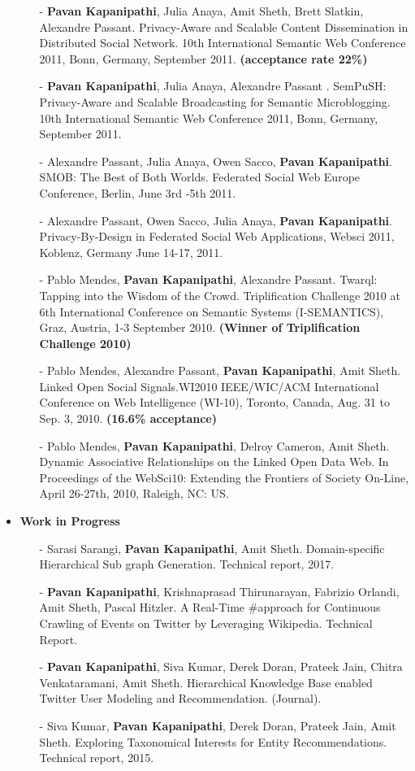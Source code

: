 \documentclass[letterpaper,9pt]{article}
\begin{document}
\begin{itemize}
\begin{itemize}
\item[-] \textbf{Pavan Kapanipathi}, Julia Anaya, Amit Sheth, Brett Slatkin, Alexandre Passant. Privacy-Aware and Scalable Content Dissemination in Distributed Social Network. 10th International Semantic Web Conference 2011, Bonn, Germany,  September 2011. \textbf{(acceptance rate 22\%)}
\item[-] \textbf{Pavan Kapanipathi}, Julia Anaya, Alexandre Passant . SemPuSH: Privacy-Aware and Scalable Broadcasting for Semantic Microblogging. 10th International Semantic Web Conference 2011, Bonn, Germany, September 2011.
\item[-]  Alexandre Passant, Julia Anaya, Owen Sacco, \textbf{Pavan Kapanipathi}. SMOB: The Best of Both Worlds. 
Federated Social Web Europe Conference, Berlin, June 3rd -5th 2011.
\item[-] Alexandre Passant, Owen Sacco, Julia Anaya, \textbf{Pavan Kapanipathi}. Privacy-By-Design in Federated Social Web Applications,  
Websci 2011, Koblenz, Germany June 14-17, 2011.
	\item[-] Pablo Mendes, \textbf{Pavan Kapanipathi}, Alexandre Passant. Twarql: Tapping into the Wisdom of the Crowd. Triplification Challenge 2010 at 6th International Conference on Semantic Systems (I-SEMANTICS), Graz, Austria, 1-3 September 2010. \textbf{(Winner of Triplification Challenge 2010)}
  \item[-] Pablo Mendes, Alexandre Passant, \textbf{Pavan Kapanipathi}, Amit Sheth. Linked Open Social Signals.WI2010 IEEE/WIC/ACM International Conference on Web Intelligence (WI-10), Toronto, Canada, Aug. 31 to Sep. 3, 2010. \textbf{(16.6\% acceptance)}
  \item[-] Pablo Mendes, \textbf{Pavan Kapanipathi}, Delroy Cameron, Amit Sheth. Dynamic Associative Relationships on the Linked Open Data Web. In Proceedings of the WebSci10: Extending the Frontiers of Society On-Line, April 26-27th, 2010, Raleigh, NC: US.      
\end{itemize}
\item \textbf{Work in Progress}
\begin{itemize}
\item[-] Sarasi Sarangi, \textbf{Pavan Kapanipathi}, Amit Sheth. Domain-specific Hierarchical Sub graph Generation. Technical report, 2017.
\item[-] \textbf{Pavan Kapanipathi}, Krishnaprasad Thirunarayan, Fabrizio Orlandi, Amit Sheth, Pascal Hitzler. A Real-Time \#approach for Continuous Crawling of Events on Twitter by Leveraging Wikipedia. Technical Report.
\item[-] \textbf{Pavan Kapanipathi}, Siva Kumar, Derek Doran, Prateek Jain, Chitra Venkataramani, Amit Sheth. Hierarchical Knowledge Base enabled Twitter User Modeling and Recommendation. (Journal).
\item[-] Siva Kumar, \textbf{Pavan Kapanipathi}, Derek Doran, Prateek Jain, Amit Sheth. Exploring Taxonomical Interests for Entity Recommendations. Technical report, 2015.



\end{itemize}
\end{itemize}
\end{document}
